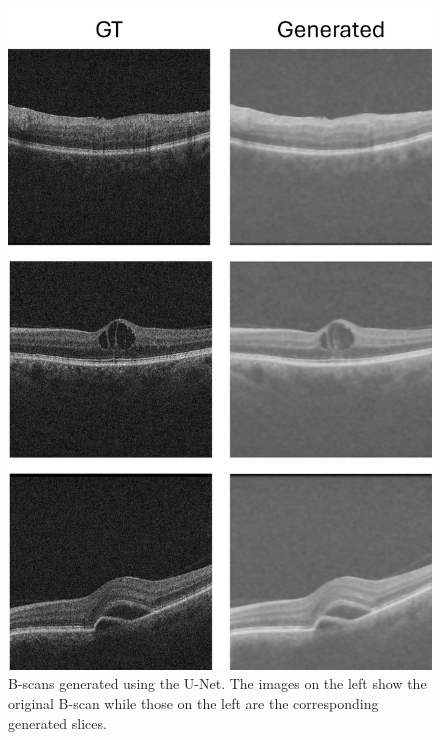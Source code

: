 \begin{figure}[!ht]
	\centering	\includegraphics[width=0.75\linewidth]{figures/GenerativeUNetResults.png}
	\caption{B-scans generated using the U-Net. The images on the left show the original B-scan while those on the left are the corresponding generated slices.}
	\label{fig:GenerativeUNetResults}
\end{figure}

